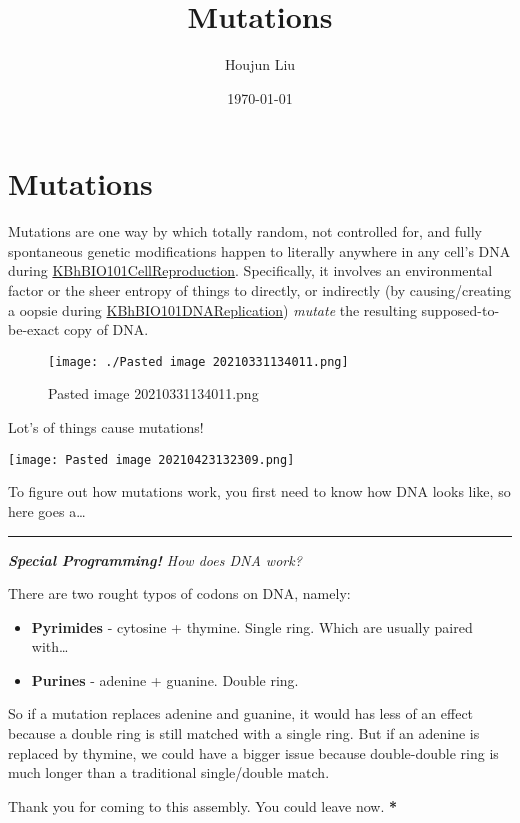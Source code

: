 \documentclass[letterpaper]{article}
\author{Houjun Liu}
\date{\today}
\title{Mutations}
\renewcommand{\tableofcontents}{}
\begin{document}
\tableofcontents



\section{Mutations}
\label{sec:orge3b338c}
Mutations are one way by which totally random, not controlled for, and
fully spontaneous genetic modifications happen to literally anywhere in
any cell's DNA during
\href{KBhBIO101CellReproduction.org}{KBhBIO101CellReproduction}.
Specifically, it involves an environmental factor or the sheer entropy
of things to directly, or indirectly (by causing/creating a oopsie
during \href{KBhBIO101DNAReplication.org}{KBhBIO101DNAReplication})
\emph{mutate} the resulting supposed-to-be-exact copy of DNA.

\begin{figure}[htbp]
\centering
\texttt{[image: ./Pasted image 20210331134011.png]}
\caption{Pasted image 20210331134011.png}
\end{figure}

Lot's of things cause mutations!
\begin{center}
\texttt{[image: Pasted image 20210423132309.png]}
\end{center}

To figure out how mutations work, you first need to know how DNA looks
like, so here goes a\ldots{}

\noindent\rule{\textwidth}{0.5pt}

\emph{\textbf{Special Programming!} How does DNA work?}

There are two rought typos of codons on DNA, namely:

\begin{itemize}
\item \textbf{Pyrimides} - cytosine + thymine. Single ring. Which are usually
paired with\ldots{}
\item \textbf{Purines} - adenine + guanine. Double ring.
\end{itemize}

So if a mutation replaces adenine and guanine, it would has less of an
effect because a double ring is still matched with a single ring. But if
an adenine is replaced by thymine, we could have a bigger issue because
double-double ring is much longer than a traditional single/double
match.

Thank you for coming to this assembly. You could leave now. \textbf{*}
\end{document}
